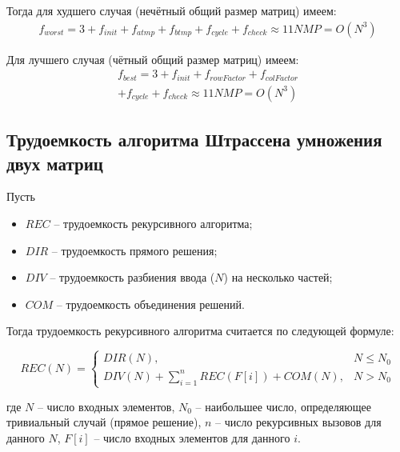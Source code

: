 Тогда для худшего случая (нечётный общий размер матриц) имеем:
\begin{equation}
	\label{сomplexity:vinograd_opt_worst}
	\begin{aligned}
		f_{worst} = 3 + f_{init} + f_{atmp} + f_{btmp} + f_{cycle} + f_{check} \approx 11NMP = O(N^3)
	\end{aligned}
\end{equation}

Для лучшего случая (чётный общий размер матриц) имеем:
\begin{equation}
	\label{сomplexity:vinograd_opt_best}
	\begin{aligned}
		f_{best} = 3 + f_{init} + f_{rowFactor} + f_{colFactor} \\
		 + f_{cycle} + f_{check} \approx 11NMP = O(N^3)
	\end{aligned}
\end{equation}

\clearpage

\subsection{Трудоемкость алгоритма Штрассена умножения двух матриц}

Пусть 
\begin{itemize}[label=---]
	\item $REC$ -- трудоемкость рекурсивного алгоритма;
	\item $DIR$ -- трудоемкость прямого решения;
	\item $DIV$ -- трудоемкость разбиения ввода ($N$) на несколько частей;
	\item $COM$ -- трудоемкость объединения решений.
\end{itemize}

Тогда трудоемкость рекурсивного алгоритма считается по следующей формуле:

\begin{equation}
	\label{eq:rec}
	REC(N) =
	\begin{cases}
		DIR(N), & N \leq N_0\\
		DIV(N) + \displaystyle\sum_{i=1}^{n} REC(F[i]) + COM(N), & N > N_0
	\end{cases}
\end{equation}

где $N$ -- число входных элементов, $N_0$ -- наибольшее число, определяющее тривиальный случай (прямое решение), $n$ -- число рекурсивных вызовов для данного $N$, $F[i]$ -- число входных элементов для данного $i$.

